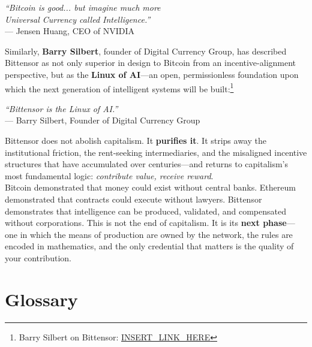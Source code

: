 \documentclass[12pt, a4paper, oneside]{report}
\theoremstyle{definition}
\begin{document}
\begin{center}
\textit{``Bitcoin is good... but imagine  much more \\Universal Currency called Intelligence.''}\\
\smallskip
{\small — Jensen Huang, CEO of NVIDIA}
\end{center}

\vspace{0.4cm}

Similarly, \textbf{Barry Silbert}, founder of Digital Currency Group, has 
described Bittensor as not only superior in design to Bitcoin from an 
incentive-alignment perspective, but as the \textbf{Linux of AI}—an open, 
permissionless foundation upon which the next generation of intelligent 
systems will be built:\footnote{Barry Silbert on Bittensor: 
\url{INSERT_LINK_HERE}}\\[0.4cm]

\begin{center}
\textit{``Bittensor is the Linux of AI.''}\\
\smallskip
{\small — Barry Silbert, Founder of Digital Currency Group}
\end{center}

\vspace{0.4cm}

Bittensor does not abolish capitalism. It \textbf{purifies it}. It strips 
away the institutional friction, the rent-seeking intermediaries, and the 
misaligned incentive structures that have accumulated over centuries—and 
returns to capitalism's most fundamental logic: \emph{contribute value, 
receive reward}.\\[0.4cm]

Bitcoin demonstrated that money could exist without central banks. Ethereum 
demonstrated that contracts could execute without lawyers. Bittensor 
demonstrates that intelligence can be produced, validated, and compensated 
without corporations. This is not the end of capitalism. It is its 
\textbf{next phase}—one in which the means of production are owned by the 
network, the rules are encoded in mathematics, and the only credential 
that matters is the quality of your contribution.




\chapter*{Glossary}
\label{glossary}
\end{document}
